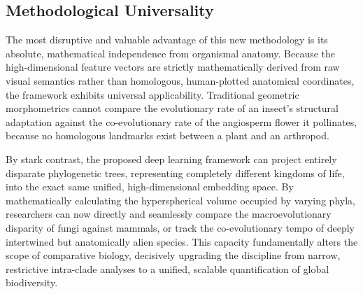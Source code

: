 \subsection{Methodological Universality}\label{subsec:methodological-universality}

The most disruptive and valuable advantage of this new methodology is its absolute, mathematical independence from organismal anatomy. Because the high-dimensional feature vectors are strictly mathematically derived from raw visual semantics rather than homologous, human-plotted anatomical coordinates, the framework exhibits universal applicability. Traditional geometric morphometrics cannot compare the evolutionary rate of an insect's structural adaptation against the co-evolutionary rate of the angiosperm flower it pollinates, because no homologous landmarks exist between a plant and an arthropod.

By stark contrast, the proposed deep learning framework can project entirely disparate phylogenetic trees, representing completely different kingdoms of life, into the exact same unified, high-dimensional embedding space. By mathematically calculating the hyperspherical volume occupied by varying phyla, researchers can now directly and seamlessly compare the macroevolutionary disparity of fungi against mammals, or track the co-evolutionary tempo of deeply intertwined but anatomically alien species. This capacity fundamentally alters the scope of comparative biology, decisively upgrading the discipline from narrow, restrictive intra-clade analyses to a unified, scalable quantification of global biodiversity.




